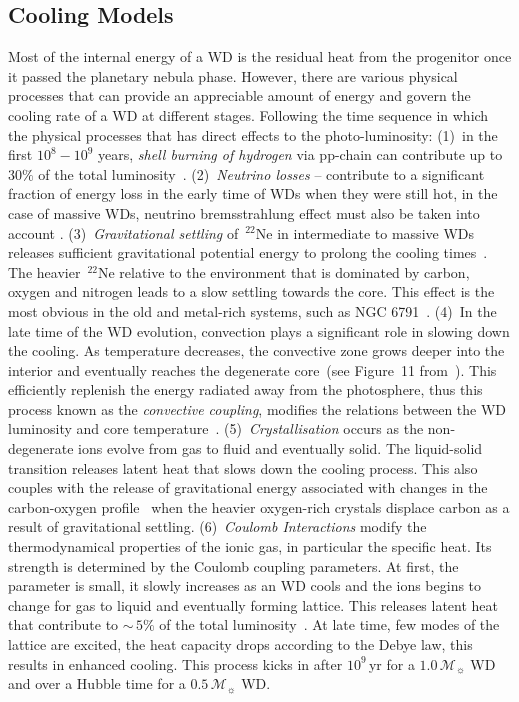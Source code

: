 \documentclass[fleqn,usenatbib]{rasti}
\newcommand{\msun}{\mathcal{M}_{\sun}}
\begin{document}
\subsection{Cooling Models}
Most of the internal energy of a WD is the residual heat from the progenitor
once it passed the planetary nebula phase. However, there are various physical
processes that can provide an appreciable amount of energy and govern the
cooling rate of a WD at different stages. Following the time sequence in which
the physical processes that has direct effects to the photo-luminosity: (1)~in
the first $10^8-10^9$ years, \textit{shell burning of hydrogen} via pp-chain
can contribute up to $30\%$ of the total luminosity~\citep{2010ApJ...717..183R}.
(2)~\textit{Neutrino losses} -- contribute to a significant fraction of energy
loss in the early time of WDs when they were still hot, in the case of massive
WDs, neutrino bremsstrahlung effect must also be taken into account
\citep{1994ApJ...425..222H, 1996ApJS..102..411I}. (3)~\textit{Gravitational
settling} of\ $^{22}$Ne in intermediate to massive WDs releases sufficient
gravitational potential energy to prolong the cooling
times~\citep{2002ApJ...580.1077D, 2008ApJ...677..473G, 2010ApJ...719..612A}.
The heavier\ $^{22}$Ne relative to the environment that is dominated by carbon,
oxygen and nitrogen leads to a slow settling towards the core. This effect is
the most obvious in the old and metal-rich systems, such as NGC
6791~\citep{2010Natur.465..194G, 2008ApJ...678.1279B}. (4)~In the late time of
the WD evolution, convection plays a significant role in slowing down the
cooling. As temperature decreases, the convective zone grows deeper into the
interior and eventually reaches the degenerate core~(see Figure~11
from~\citealt{2010A&ARv..18..471A}). This efficiently replenish the energy
radiated away from the photosphere, thus this process known as the
\textit{convective coupling}, modifies the relations between the WD luminosity
and core temperature~\citep{1989ApJ...347..934D, 2001PASP..113..409F}.
(5)~\textit{Crystallisation} occurs as the non-degenerate ions evolve from gas
to fluid and eventually solid. The liquid-solid transition releases latent
heat that slows down the cooling process. This also couples with the release
of gravitational energy associated with changes in the carbon-oxygen
profile~\citep{1997ApJ...486..413S} when the heavier oxygen-rich crystals
displace carbon as a result of gravitational settling. (6)~\textit{Coulomb
Interactions} modify the thermodynamical properties of the ionic gas, in
particular the specific heat. Its strength is determined by the Coulomb
coupling parameters. At first, the parameter is small, it slowly increases as
an WD cools and the ions begins to change for gas to liquid and eventually
forming lattice. This releases latent heat that contribute to $\sim$\,$5\%$
of the total luminosity~\citep{1976A&A....51..383S}. At late time, few modes
of the lattice are excited, the heat capacity drops according to the Debye law,
this results in enhanced cooling. This process kicks in after $10^9$\,yr for a
$1.0\,\msun$ WD and over a Hubble time for a $0.5\,\msun$ WD.
\end{document}
